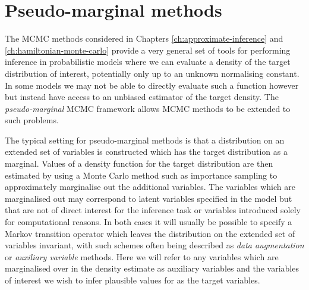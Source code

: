 \chapter{Pseudo-marginal methods}\label{ch:pseudo-marginal-methods}

The \ac{MCMC} methods considered in Chapters \ref{ch:approximate-inference} and \ref{ch:hamiltonian-monte-carlo} provide a very general set of tools for performing inference in probabilistic models where we can evaluate a density of the target distribution of interest, potentially only up to an unknown normalising constant. In some models we may not be able to directly evaluate such a function however but instead have access to an unbiased estimator of the target density. The \emph{pseudo-marginal} \ac{MCMC} framework \citep{andrieu2009pseudo} allows \ac{MCMC} methods to be extended to such problems.

The typical setting for pseudo-marginal methods is that a distribution on an extended set of variables is constructed which has the target distribution as a marginal. Values of a density function for the target distribution are then estimated by using a Monte Carlo method such as importance sampling to approximately marginalise out the additional variables. The variables which are marginalised out may correspond to latent variables specified in the model but that are not of direct interest for the inference task or variables introduced solely for computational reasons. In both cases it will usually be possible to specify a Markov transition operator which leaves the distribution on the extended set of variables invariant, with such schemes often being described as \emph{data augmentation} \citep{tanner1987calculation,van2001art} or \emph{auxiliary variable}  \citep{edwards1988generalization,higdon1998auxiliary} methods. Here we will refer to any variables which are marginalised over in the density estimate as auxiliary variables and the variables of interest we wish to infer plausible values for as the target variables.

